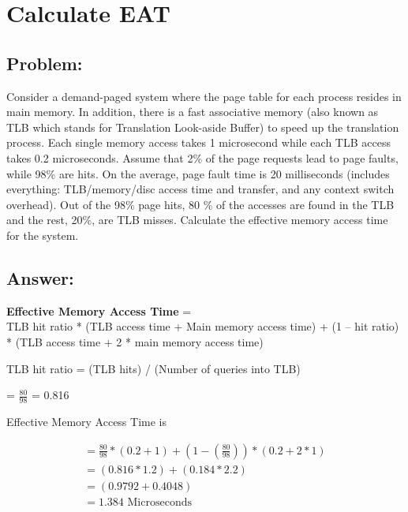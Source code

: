 \newpage
\section{Calculate EAT}
\subsection{Problem:}
Consider a demand-paged system where the page table for each process resides in main memory. In
addition, there is a fast associative memory (also known as TLB which stands for Translation Look-aside
Buffer) to speed up the translation process. Each single memory access takes 1 microsecond while each
TLB access takes 0.2 microseconds. Assume that 2\% of the page requests lead to page faults, while 98\%
are hits. On the average, page fault time is 20 milliseconds (includes everything: TLB/memory/disc access
time and transfer, and any context switch overhead). Out of the 98\% page hits, 80 \% of the accesses are
found in the TLB and the rest, 20\%, are TLB misses. Calculate the effective memory access time for the
system.

\subsection{Answer:}
\textbf{Effective Memory Access Time} = \\
TLB hit ratio * (TLB access time + Main memory access time) + (1 – hit ratio) * (TLB access time + 2 * main memory access time)

TLB hit ratio = (TLB hits) / (Number of queries into TLB)

= $\frac{80}{98}$ = 0.816

Effective Memory Access Time is

\begin{align*}
    = \frac{80}{98} * (0.2+1)+(1-(\frac{80}{98}))*(0.2+2*1) \\
= (0.816*1.2)+(0.184*2.2) \\
= (0.9792 + 0.4048) \\
= 1.384 \text{ Microseconds}
\end{align*}

